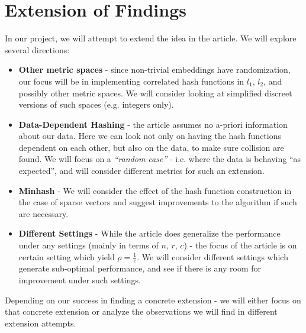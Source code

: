 \documentclass[11pt]{article}
\begin{document}
\section{Extension of Findings}
In our project, we will attempt to extend the idea in the article. We will explore several directions:
\begin{itemize}
	\item \textbf{Other metric spaces} - since non-trivial embeddings have randomization, our focus will be in implementing correlated hash functions in $l_1$, $l_2$, and possibly other metric spaces. We will consider looking at simplified discreet versions of such spaces (e.g. integers only).
	\item \textbf{Data-Dependent Hashing} - the article assumes no a-priori information about our data. Here we can look not only on having the hash functions dependent on each other, but also on the data, to make sure collision are found. We will focus on a {\em ``random-case''} - i.e. where the data is behaving ``as expected'', and will consider different metrics for such an extension.
	\item \textbf{Minhash} - We will consider the effect of the hash function construction in the case of sparse vectors and suggest improvements to the algorithm if such are necessary.
	\item \textbf{Different Settings} - While the article does generalize the performance under any settings (mainly in terms of $n$, $r$, $c$) - the focus of the article is on certain setting which yield $\rho = \frac{1}{c}$. We will consider different settings which generate sub-optimal performance, and see if there is any room for improvement under such settings.
\end{itemize}
Depending on our success in finding a concrete extension - we will either focus on that concrete extension or analyze the observations we will find in different extension attempts.
\end{document}
